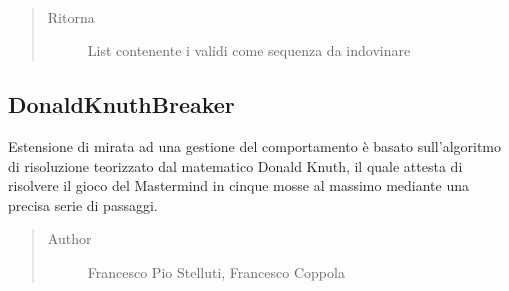 \documentclass[letterpaper,10pt,italian,openany,oneside]{sphinxmanual}
\begin{document}
\begin{fulllineitems}
\label{\detokenize{source/it/unicam/cs/pa/mastermind/players/CodeMaker:it.unicam.cs.pa.mastermind.players.CodeMaker.getCodeToGuess()}}~\begin{quote}\begin{description}
\item[{Ritorna}] \leavevmode
List contenente i  validi come sequenza da indovinare

\end{description}\end{quote}

\end{fulllineitems}



\subsection{DonaldKnuthBreaker}
\label{\detokenize{source/it/unicam/cs/pa/mastermind/players/DonaldKnuthBreaker:donaldknuthbreaker}}\label{\detokenize{source/it/unicam/cs/pa/mastermind/players/DonaldKnuthBreaker::doc}}

\begin{fulllineitems}
\label{\detokenize{source/it/unicam/cs/pa/mastermind/players/DonaldKnuthBreaker:it.unicam.cs.pa.mastermind.players.DonaldKnuthBreaker}}
Estensione di  mirata ad una gestione del comportamento è basato sull’algoritmo di risoluzione teorizzato dal matematico Donald Knuth, il quale attesta di risolvere il gioco del Mastermind in cinque mosse al massimo mediante una precisa serie di passaggi.
\begin{quote}\begin{description}
\item[{Author}] \leavevmode
Francesco Pio Stelluti, Francesco Coppola

\end{description}\end{quote}

\end{fulllineitems}
\end{document}
